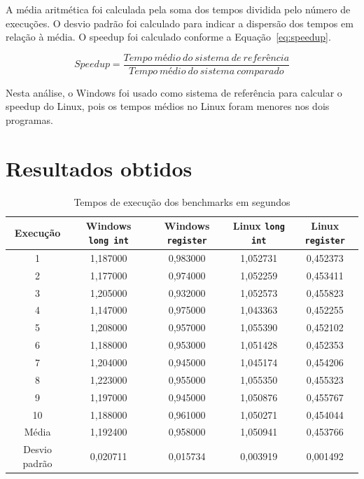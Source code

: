 \documentclass[12pt,oneside,a4paper,brazil]{abntex2}
\begin{document}
A média aritmética foi calculada pela soma dos tempos dividida pelo número de execuções. O desvio padrão foi calculado para indicar a dispersão dos tempos em relação à média. O speedup foi calculado conforme a Equação~\ref{eq:speedup}.

\begin{equation}
\label{eq:speedup}
Speedup = \frac{Tempo\ médio\ do\ sistema\ de\ referência}{Tempo\ médio\ do\ sistema\ comparado}
\end{equation}

Nesta análise, o Windows foi usado como sistema de referência para calcular o speedup do Linux, pois os tempos médios no Linux foram menores nos dois programas.

\section{Resultados obtidos}

\begin{table}[htbp]
\centering
\caption{Tempos de execução dos benchmarks em segundos}
\label{tab:resultados}
\begin{tabular}{ccccc}
\toprule
Execução & Windows \texttt{long int} & Windows \texttt{register} & Linux \texttt{long int} & Linux \texttt{register} \\
\midrule
1 & 1,187000 & 0,983000 & 1,052731 & 0,452373 \\
2 & 1,177000 & 0,974000 & 1,052259 & 0,453411 \\
3 & 1,205000 & 0,932000 & 1,052573 & 0,455823 \\
4 & 1,147000 & 0,975000 & 1,043363 & 0,452255 \\
5 & 1,208000 & 0,957000 & 1,055390 & 0,452102 \\
6 & 1,188000 & 0,953000 & 1,051428 & 0,452353 \\
7 & 1,204000 & 0,945000 & 1,045174 & 0,454206 \\
8 & 1,223000 & 0,955000 & 1,055350 & 0,455323 \\
9 & 1,197000 & 0,945000 & 1,050876 & 0,455767 \\
10 & 1,188000 & 0,961000 & 1,050271 & 0,454044 \\
\midrule
Média & 1,192400 & 0,958000 & 1,050941 & 0,453766 \\
Desvio padrão & 0,020711 & 0,015734 & 0,003919 & 0,001492 \\
\bottomrule
\end{tabular}
\end{table}
\end{document}

